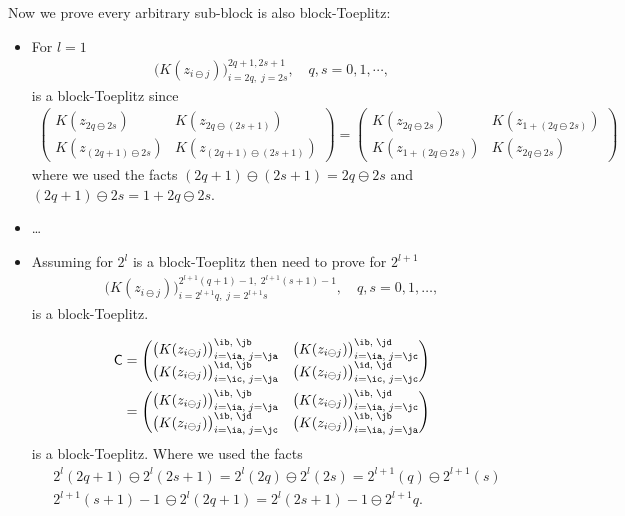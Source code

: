 \documentclass[graybox,footinfo]{svmult}
\newcommand{\mC}{\mathsf{C}}
\begin{document}
\iffalse
Now we prove every arbitrary sub-block is also block-Toeplitz: 
\begin{itemize}
	\item For $l=1$
	\begin{align*}
	\bigl( K(z_{i \ominus j})\bigr)_{i=2q, \; j=2s}^{2q+1, 2s+1}, \quad q,s=0,1,\cdots,
	\end{align*}
	is a block-Toeplitz since
	\begin{align*}
	\begin{pmatrix}
	K(z_{2q \ominus 2s}) & K(z_{2q \ominus (2s +1)}) \\
	K(z_{(2q+1) \ominus 2s}) & K(z_{(2q+1) \ominus (2s +1)}) 
	\end{pmatrix}
	=
	\begin{pmatrix}
	K(z_{2q \ominus 2s}) & K(z_{1 + (2q \ominus 2s)}) \\
	K(z_{1 + (2q \ominus 2s)}) & K(z_{ 2q \ominus 2s}) 
	\end{pmatrix}
	\end{align*}
	where we used the facts $(2q+1) \ominus (2s+1) = 2q \ominus 2s$ and $(2q+1) \ominus 2s = 1 + 2q \ominus 2s$.
	
	\item \ldots
	
	\item Assuming for $2^{l}$ is a block-Toeplitz then need to prove for $2^{l+1}$ 
	\begin{align*}
	\bigl( K(z_{i \ominus j})\bigr)_{i=2^{l+1}q, \; j=2^{l+1}s}^{2^{l+1}(q+1)-1, \; 2^{l+1}(s+1)-1}, \quad q,s=0,1,\dots,
	\end{align*}
	is a block-Toeplitz.
	
	\begin{align*}
	\mC &=
	\begin{pmatrix}
	\bigl( K(z_{i \ominus j})\bigr)_{i=\ia, \; j=\ja }^{\ib, \; \jb} & \bigl( K(z_{i \ominus j})\bigr)_{i=\ia, \; j=\jc }^{\ib, \; \jd} \\
	\bigl( K(z_{i \ominus j})\bigr)_{i=\ic, \; j=\ja }^{\id, \; \jb} & \bigl( K(z_{i \ominus j})\bigr)_{i=\ic, \; j=\jc }^{\id, \; \jd}
	\end{pmatrix} \\
	& =
	\begin{pmatrix}
	\bigl( K(z_{i \ominus j})\bigr)_{i=\ia, \; j=\ja }^{\ib, \; \jb} & \bigl( K(z_{i \ominus j})\bigr)_{i=\ia, \; j=\jc }^{\ib, \; \jd} \\
	\bigl( K(z_{i \ominus j})\bigr)_{i=\ia, \; j=\jc }^{\ib, \; \jd} & \bigl( K(z_{i \ominus j})\bigr)_{i=\ia, \; j=\ja }^{\ib, \; \jb}
	\end{pmatrix}
	\end{align*}
	is a block-Toeplitz. Where we used the facts
	\begin{align*}
	& 2^{l}(2q+1) \ominus 2^{l}(2s+1) = 2^{l}(2q) \ominus 2^{l}(2s) = 2^{l+1}(q) \ominus 2^{l+1}(s) \\
	&2^{l+1}(s+1)-1 \, \ominus 2^{l}(2q + 1) %
	= 2^{l}(2s+1)-1 \ominus 2^{l+1}q.
	\end{align*}
	

\end{itemize}
\end{document}
